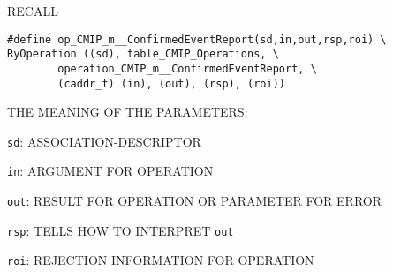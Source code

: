 %
%
%
%
%
%
%
%


\begin{bwslide}

\begin{nrtc}
\item	RECALL
\begin{verbatim}
#define op_CMIP_m__ConfirmedEventReport(sd,in,out,rsp,roi) \
RyOperation ((sd), table_CMIP_Operations, \
        operation_CMIP_m__ConfirmedEventReport, \
        (caddr_t) (in), (out), (rsp), (roi))
\end{verbatim}

\item	THE MEANING OF THE PARAMETERS:
    \begin{nrtc}
    \item	\verb"sd": ASSOCIATION-DESCRIPTOR

    \item	\verb"in": ARGUMENT FOR OPERATION

    \item	\verb"out": RESULT FOR OPERATION OR PARAMETER FOR ERROR

    \item	\verb"rsp": TELLS HOW TO INTERPRET \verb"out"

    \item	\verb"roi": REJECTION INFORMATION FOR OPERATION
    \end{nrtc}
\end{nrtc}
\end{bwslide}


